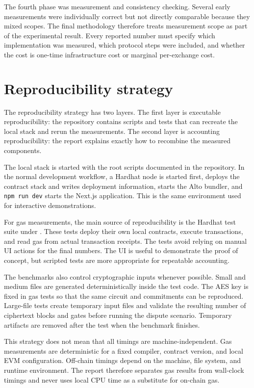 The fourth phase was measurement and consistency checking. Several early measurements were
individually correct but not directly comparable because they mixed scopes. The final
methodology therefore treats measurement scope as part of the experimental result. Every
reported number must specify which implementation was measured, which protocol steps were
included, and whether the cost is one-time infrastructure cost or marginal per-exchange
cost.

\section{Reproducibility strategy}

The reproducibility strategy has two layers. The first layer is executable reproducibility:
the repository contains scripts and tests that can recreate the local stack and rerun the
measurements. The second layer is accounting reproducibility: the report explains exactly how
to recombine the measured components.

The local stack is started with the root scripts documented in the repository. In the normal
development workflow, a Hardhat node is started first,  deploys the
contract stack and writes deployment information,  starts the Alto bundler,
and \texttt{npm\ run\ dev} starts the Next.js application. This is the same environment used for
interactive demonstrations.

For gas measurements, the main source of reproducibility is the Hardhat test suite under
. These tests deploy their own local contracts, execute
transactions, and read gas from actual transaction receipts. The tests avoid relying on
manual UI actions for the final numbers. The UI is useful to demonstrate the proof of
concept, but scripted tests are more appropriate for repeatable accounting.

The benchmarks also control cryptographic inputs whenever possible. Small and medium files
are generated deterministically inside the test code. The AES key is fixed in gas tests so
that the same circuit and commitments can be reproduced. Large-file tests create temporary
input files and validate the resulting number of ciphertext blocks and gates before running
the dispute scenario. Temporary artifacts are removed after the test when the benchmark
finishes.

This strategy does not mean that all timings are machine-independent. Gas measurements are
deterministic for a fixed compiler, contract version, and local EVM configuration. Off-chain
timings depend on the machine, file system, and runtime environment. The report therefore
separates gas results from wall-clock timings and never uses local CPU time as a substitute
for on-chain gas.

